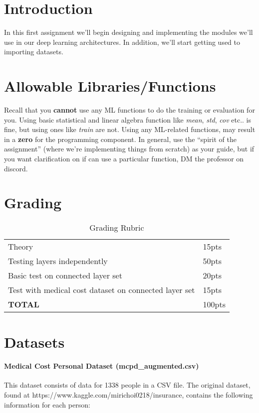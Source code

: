 \documentclass[12pt]{article}
\begin{document}
\maketitle


\section*{Introduction}
In this first assignment we'll begin designing and implementing the modules we'll use in our deep learning architectures.  In addition, we'll start getting used to importing datasets.

\section*{Allowable Libraries/Functions}
Recall that you \textbf{cannot} use any ML functions to do the training or evaluation for you.  Using basic statistical and linear algebra function like \emph{mean}, \emph{std}, \emph{cov} etc.. is fine, but using ones like \emph{train} are not. Using any ML-related functions, may result in a \textbf{zero} for the programming component.  In general, use the ``spirit of the assignment'' (where we're implementing things from scratch) as your guide, but if you want clarification on if can use a particular function, DM the professor on discord.


\section*{Grading}
\begin{table}[h]
\begin{center}
\begin{tabular}{|l|l|}
\hline
Theory & 15pts\\
Testing layers independently & 50pts\\
Basic test on connected layer set & 20pts\\
Test with medical cost dataset on connected layer set & 15pts\\
\hline
\textbf{TOTAL} & 100pts \\
\hline
\end{tabular}
\caption{Grading Rubric}
\end{center}
\end{table}

\newpage
\section*{Datasets}
\paragraph{Medical Cost Personal Dataset  (mcpd\_augmented.csv)}
This dataset consists of data for 1338 people in a CSV file.  The original dataset, found at https://www.kaggle.com/mirichoi0218/insurance, contains the following information for each person:
\end{document}
